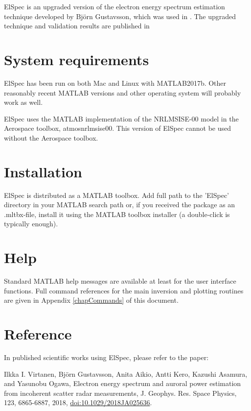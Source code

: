 \documentclass[12pt,a4paper]{report}
\begin{document}
ElSpec is an upgraded version of the electron energy spectrum estimation technique developed by Bj{\"o}rn Gustavsson, which was used in \citep{dahlgren2011}. The upgraded technique and validation results are published in \citep{virtanen2018}

\section{System requirements}

ElSpec has been run on both Mac and Linux with MATLAB2017b. Other reasonably recent MATLAB versions and other operating system will probably work as well. 

ElSpec uses the MATLAB implementation of the NRLMSISE-00 model in the Aerospace toolbox, atmosnrlmsise00. This version of ElSpec cannot be used without the Aerospace toolbox. 

\section{Installation}

ElSpec is distributed as a MATLAB toolbox. Add full path to the 'ElSpec' directory in your MATLAB search path or, if you received the package as an .mltbx-file, install it using the MATLAB toolbox installer (a double-click is typically enough).


\section{Help}\label{help}

Standard MATLAB help messages are available at least for the user interface functions. Full command references for the main inversion and plotting routines are given in Appendix \ref{chapCommands} of this document. 


\section{Reference}

In published scientific works using ElSpec, please refer to the paper:

Ilkka I. Virtanen, Bj{\"o}rn Gustavsson, Anita Aikio, Antti Kero, Kazushi Asamura, and Yasunobu Ogawa, Electron energy spectrum and auroral power estimation from incoherent scatter radar measurements, J. Geophys. Res. Space Physics, 123, 6865-6887, 2018, \href{https://doi.org/doi:10.1029/2018JA025636}{doi:10.1029/2018JA025636}.
\end{document}
